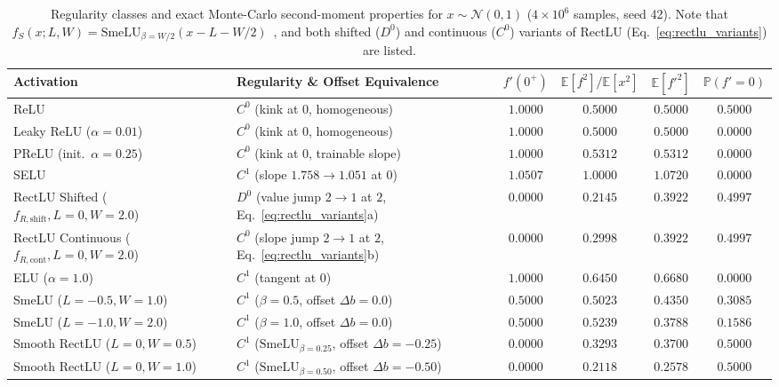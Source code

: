 \documentclass[10pt,a4paper]{article}
\begin{document}
\begin{table}[t]
\centering
\caption{Regularity classes and exact Monte-Carlo second-moment properties for $x \sim \mathcal{N}(0,1)$ ($4 \times 10^6$ samples, seed 42). Note that $f_S(x; L, W) = \text{SmeLU}_{\beta=W/2}(x - L - W/2)$~\cite{shamir2020}, and both shifted ($D^0$) and continuous ($C^0$) variants of RectLU (Eq.~\ref{eq:rectlu_variants}) are listed.}
\label{tab:moments}
\footnotesize
\setlength{\tabcolsep}{5pt}
\renewcommand{\arraystretch}{1.05}
\begin{tabular}{llcccc}
\toprule
\textbf{Activation} & \textbf{Regularity \& Offset Equivalence} & $f'(0^+)$ & $\mathbb{E}[f^2]/\mathbb{E}[x^2]$ & $\mathbb{E}[f'^2]$ & $\mathbb{P}(f'=0)$ \\
\midrule
ReLU & $C^0$ (kink at $0$, homogeneous) & $1.0000$ & $0.5000$ & $0.5000$ & $0.5000$ \\
Leaky ReLU ($\alpha=0.01$) & $C^0$ (kink at $0$, homogeneous) & $1.0000$ & $0.5000$ & $0.5000$ & $0.0000$ \\
PReLU (init.\ $\alpha=0.25$) & $C^0$ (kink at $0$, trainable slope) & $1.0000$ & $0.5312$ & $0.5312$ & $0.0000$ \\
SELU & $C^1$ (slope $1.758 \to 1.051$ at $0$) & $1.0507$ & $1.0000$ & $1.0720$ & $0.0000$ \\
RectLU Shifted ($f_{R,\text{shift}}, L=0, W=2.0$) & $D^0$ (value jump $2 \to 1$ at $2$, Eq.~\ref{eq:rectlu_variants}a) & $0.0000$ & $0.2145$ & $0.3922$ & $0.4997$ \\
RectLU Continuous ($f_{R,\text{cont}}, L=0, W=2.0$) & $C^0$ (slope jump $2 \to 1$ at $2$, Eq.~\ref{eq:rectlu_variants}b) & $0.0000$ & $0.2998$ & $0.3922$ & $0.4997$ \\
ELU ($\alpha=1.0$) & $C^1$ (tangent at $0$) & $1.0000$ & $0.6450$ & $0.6680$ & $0.0000$ \\
SmeLU ($L=-0.5, W=1.0$)~\cite{shamir2020} & $C^1$ ($\beta=0.5$, offset $\Delta b = 0.0$) & $0.5000$ & $0.5023$ & $0.4350$ & $0.3085$ \\
SmeLU ($L=-1.0, W=2.0$)~\cite{shamir2020} & $C^1$ ($\beta=1.0$, offset $\Delta b = 0.0$) & $0.5000$ & $0.5239$ & $0.3788$ & $0.1586$ \\
Smooth RectLU ($L=0, W=0.5$) & $C^1$ ($\text{SmeLU}_{\beta=0.25}$, offset $\Delta b = -0.25$) & $0.0000$ & $0.3293$ & $0.3700$ & $0.5000$ \\
Smooth RectLU ($L=0, W=1.0$) & $C^1$ ($\text{SmeLU}_{\beta=0.50}$, offset $\Delta b = -0.50$) & $0.0000$ & $0.2118$ & $0.2578$ & $0.5000$ \\

\end{tabular}
\end{table}
\end{document}
